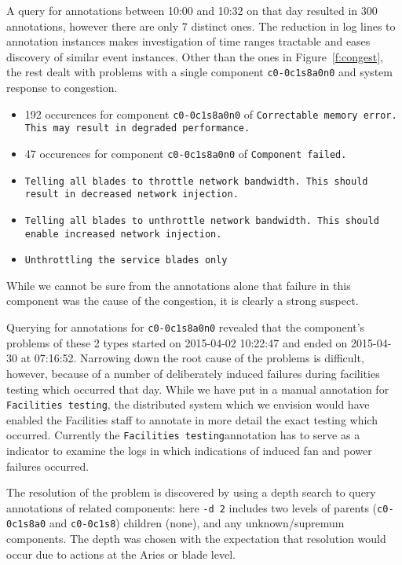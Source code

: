 A query for annotations between 10:00 and 10:32 on that day resulted in 300 annotations, however there are only 7 distinct ones.
The reduction in log lines to annotation instances makes investigation of time ranges tractable and eases discovery
of similar event instances. Other than the ones in Figure~\ref{f:congest}, the rest dealt with problems with a single component \texttt{c0-0c1s8a0n0} and system
response to congestion.
\begin{itemize}
\item  192 occurences for component \texttt{c0-0c1s8a0n0} of \scriptsize\texttt{Correctable memory error.  This may result in degraded performance.}\normalsize
\item  47 occurences for component \texttt{c0-0c1s8a0n0} of \scriptsize\texttt{Component failed.}\normalsize
\item \scriptsize\texttt{Telling all blades to throttle network bandwidth. This should result in decreased network injection.}\normalsize
\item \scriptsize\texttt{Telling all blades to unthrottle network bandwidth. This should enable increased network injection.}\normalsize
\item \scriptsize\texttt{Unthrottling the service blades only}\normalsize
\end{itemize}


While we cannot be sure from the annotations alone that failure in this component was the cause of the congestion, it
is clearly a strong suspect.

Querying for annotations for \texttt{c0-0c1s8a0n0} revealed that the component's problems of these 2 types
started on 2015-04-02 10:22:47 and ended on 2015-04-30 at 07:16:52.
Narrowing down the root cause of the problems is difficult, however, because of a number of deliberately induced failures
during facilities testing which occurred that day. While we have put in a manual annotation for \scriptsize\texttt{Facilities testing}\normalsize,
the distributed system which we envision would have enabled the Facilities staff to annotate in more detail the exact testing which occurred.
Currently the \scriptsize\texttt{Facilities testing}\normalsize annotation has to serve as a indicator to examine the logs in which
indications of induced fan and power failures occurred.

The resolution of the problem is discovered by using a depth search to query annotations of related components: here \texttt{-d 2}
includes two levels of parents (\texttt{c0-0c1s8a0} and \texttt{c0-0c1s8}) children (none), and any unknown/supremum components.
The depth was chosen with the expectation that resolution would occur due to actions at the Aries or blade level.

